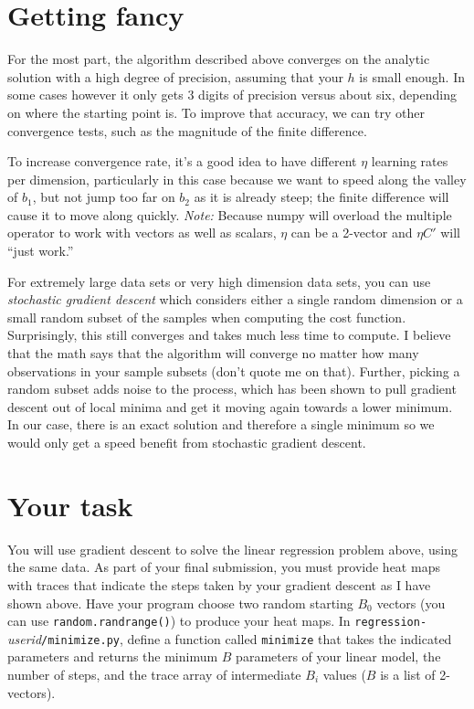 \documentclass[titlepage]{tufte-book}
\newcounter{problem}
\begin{document}
\begin{fullwidth}
\section{Getting fancy}

For the most part, the algorithm described above converges on the analytic solution with a high degree of precision, assuming that your $h$ is small enough. In some cases however it only gets 3 digits of precision versus about six, depending on where the starting point is. To improve that accuracy, we can try other convergence tests, such as the magnitude of the finite difference.

To increase convergence rate, it's a good idea to have different $\eta$ learning rates per dimension, particularly in this case because we want to speed along the valley of $b_1$, but not jump too far on $b_2$ as it is already steep; the finite difference will cause it to move along quickly. {\em Note:} Because numpy will overload the {\tt *} multiple operator to work with vectors as well as scalars, $\eta$ can be a 2-vector and $\eta C'$ will ``just work.''

For extremely large data sets or very high dimension data sets, you can use {\em stochastic gradient descent} which considers either a single random dimension or a small random subset of the samples when computing the cost function. Surprisingly, this still converges and takes much less time to compute. I believe that the math says that the algorithm will converge no matter how many observations in your sample subsets (don't quote me on that). Further, picking a random subset adds noise to the process, which has been shown to pull gradient descent out of local minima and get it moving again towards a lower minimum. In our case, there is an exact solution and therefore a single minimum so we would only get a speed benefit from stochastic gradient descent.

\section{Your task}

You will use gradient descent to solve the linear regression problem above, using the same data. As part of your final submission, you must provide heat maps with traces that indicate the steps taken by your gradient descent as I have shown above.  Have your program choose two random starting $B_0$ vectors (you can use {\tt random.randrange()}) to produce your heat maps.   In {\tt regression-}{\em userid}{\tt /minimize.py}, define a function called {\tt minimize} that takes the indicated parameters and returns the minimum $B$ parameters of your linear model, the number of steps, and the trace array of intermediate $B_i$ values ($B$ is a list of 2-vectors).


\end{fullwidth}
\end{document}

